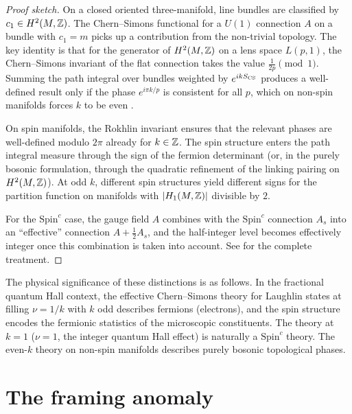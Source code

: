 \begin{proof}[Proof sketch]
On a closed oriented three-manifold, line bundles are classified by $c_1 \in H^2(M,\mathbb{Z})$. The Chern--Simons functional for a $U(1)$ connection $A$ on a bundle with $c_1 = m$ picks up a contribution from the non-trivial topology. The key identity is that for the generator of $H^2(M,\mathbb{Z})$ on a lens space $L(p,1)$, the Chern--Simons invariant of the flat connection takes the value $\frac{1}{2p} \pmod{1}$. Summing the path integral over bundles weighted by $e^{ikS_{\operatorname{CS}}}$ produces a well-defined result only if the phase $e^{i\pi k/p}$ is consistent for all $p$, which on non-spin manifolds forces $k$ to be even \cite{SeibergWitten2016Spin}.

On spin manifolds, the Rokhlin invariant ensures that the relevant phases are well-defined modulo $2\pi$ already for $k\in\mathbb{Z}$. The spin structure enters the path integral measure through the sign of the fermion determinant (or, in the purely bosonic formulation, through the quadratic refinement of the linking pairing on $H^2(M,\mathbb{Z})$). At odd $k$, different spin structures yield different signs for the partition function on manifolds with $|H_1(M,\mathbb{Z})|$ divisible by $2$.

For the $\mathrm{Spin}^c$ case, the gauge field $A$ combines with the $\mathrm{Spin}^c$ connection $A_s$ into an ``effective'' connection $A + \frac{1}{2}A_s$, and the half-integer level becomes effectively integer once this combination is taken into account. See \cite{SeibergWitten2016Spin} for the complete treatment.
\end{proof}

\begin{remark}\label{rem:appC-physical-interpretation}
The physical significance of these distinctions is as follows. In the fractional quantum Hall context, the effective Chern--Simons theory for Laughlin states at filling $\nu = 1/k$ with $k$ odd describes fermions (electrons), and the spin structure encodes the fermionic statistics of the microscopic constituents. The theory at $k=1$ ($\nu=1$, the integer quantum Hall effect) is naturally a $\mathrm{Spin}^c$ theory. The even-$k$ theory on non-spin manifolds describes purely bosonic topological phases.
\end{remark}

\section{The framing anomaly}\label{sec:appC-framing}

